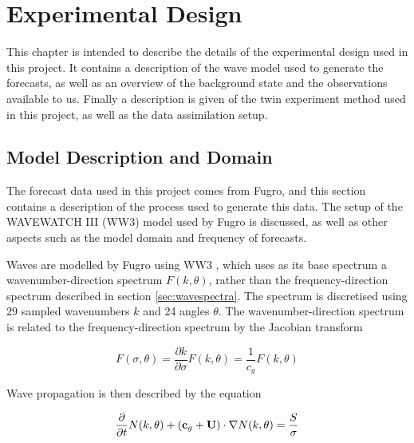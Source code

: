 
\chapter{Experimental Design} %

\label{chap:expsetup} %

This chapter is intended to describe the details of the experimental design used in this project. It contains a description of the wave model used to generate the forecasts, as well as an overview of the background state and the observations available to us. Finally a description is given of the twin experiment method used in this project, as well as the data assimilation setup.


\section{Model Description and Domain}
\label{sec:model}

The forecast data used in this project comes from Fugro, and this section contains a description of the process used to generate this data. The setup of the WAVEWATCH III (WW3) model used by Fugro is discussed, as well as other aspects such as the model domain and frequency of forecasts.

Waves are modelled by Fugro using WW3 \citep{WW3DG2019}, which uses as its base spectrum a wavenumber-direction spectrum $F(k,\theta)$, rather than the frequency-direction spectrum described in section \ref{sec:wavespectra}. The spectrum is discretised using 29 sampled wavenumbers $k$ and 24 angles $\theta$. The wavenumber-direction spectrum is related to the frequency-direction spectrum by the Jacobian transform

\[
F(\sigma,\theta) = \frac{\partial k}{\partial \sigma}F(k,\theta) = \frac{1}{c_g}F(k,\theta)
\]

Wave propagation is then described by the equation

\begin{equation}
    \frac{\partial}{\partial t}N(k,\theta) + \left( \mathbf{c}_g + \mathbf{U} \right) \cdot \nabla N(k,\theta) = \frac S \sigma
\end{equation}

